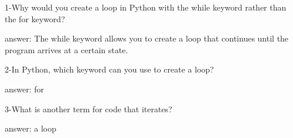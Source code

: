 1-Why would you create a loop in Python with the while keyword rather than the for keyword?

answer: The while keyword allows you to create a loop that continues until the program arrives at a certain state.

2-In Python, which keyword can you use to create a loop?

answer: for

3-What is another term for code that iterates?

answer: a loop
